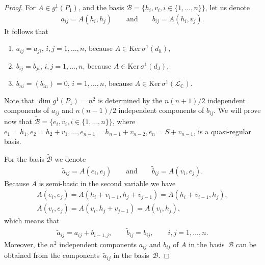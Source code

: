 \documentclass[pdftex]{sigma}
\numberwithin{equation}{section}
\begin{document}
\begin{proof}
For $A\in g^1(P_1)$, and the basis $\mathcal{B}=\{h_i, v_i, i\in
\{1,\dots ,n\}\}$, let us denote
\begin{gather*}
a_{ij}=A(h_i, h_j) \qquad \mathrm{and} \qquad  b_{ij}=A(h_i,
v_j).\end{gather*}
It follows that \begin{enumerate}\itemsep=0pt
\item $a_{ij} = a_{ji}$, $i,j = 1,\dots ,n$, because $A \in
  \mathrm{Ker} \, \sigma^1(d_h)$,
\item $b_{ij} = b_{ji}$,   $i,j = 1,\dots ,n$, because $A \in
  \mathrm{Ker} \, \sigma^1(d_J)$,
\item $b_{ni} =(b_{in} )= 0$,   $i = 1,\dots ,n$, because $A \in
  \mathrm{Ker} \, \sigma^1(\mathcal L_{\mathbb{C}})$.
\end{enumerate}
Note that $\dim  g^1(P_1)=n^2$ is determined by the $n(n+1)/2$ independent components
  of $a_{ij}$ and $n(n-1)/2$ independent components of $b_{ij}$.
We will prove now that $\widetilde{\mathcal{B}}=\{e_i, v_i, i\in \{1,\dots ,n\}\}$,
where $e_1=h_1, e_2=h_2+v_1,\dots , e_{n-1}=h_{n-1}+v_{n-2},
e_n=S+v_{n-1}$, is a quasi-regular basis.

For the basis $\widetilde{\mathcal{B}}$ we denote
\begin{gather*}
  \tilde{a}_{ij}= A(e_i,e_j)  \qquad \mathrm{and} \qquad  \tilde{b}_{ij} = A(v_i,e_j).
\end{gather*}
Because $A$ is semi-basic in the second variable we have
\begin{gather*}
    A(e_i,e_j) = A(h_i+v_{i-1},h_j+v_{j-1}) = A(h_i+v_{i-1},h_j),
  \\
    A(v_i,e_j) = A(v_i,h_j+v_{j-1}) = A(v_i,h_j),
\end{gather*}
which means that
\begin{gather*}
  \tilde{a}_{ij}   = a_{ij} + b_{i-1,j}, \qquad   %
   \tilde{b}_{ij}  = b_{ij},\qquad    i,j  =1,\dots ,n.
\end{gather*}  Moreover, the $n^2$ independent components $a_{ij}$
and $b_{ij}$ of $A$ in the basis~$\mathcal{B}$ can be obtained from
the components~$\tilde{a}_{ij}$ in the basis~$\widetilde{\mathcal{B}}$.


\end{proof}
\end{document}
